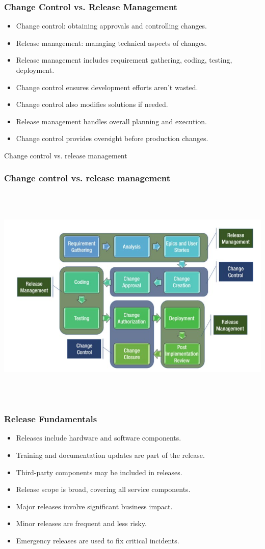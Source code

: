 \documentclass[aspectratio=169, table]{beamer}
\begin{document}
\begin{frame}
	\frametitle{Change Control vs. Release Management}
	\begin{itemize}
		\item Change control: obtaining approvals and controlling changes.
		\item Release management: managing technical aspects of changes.
		\item Release management includes requirement gathering, coding, testing, deployment.
		\item Change control ensures development efforts aren't wasted.
		\item Change control also modifies solutions if needed.
		\item Release management handles overall planning and execution.
		\item Change control provides oversight before production changes.
	\end{itemize}
\end{frame}

\begin{frame}{Change control vs. release management} 	 \frametitle{Change control vs. release management} \begin{center} 	\includegraphics[width=0.8\linewidth]{images/image-01.png} \end{center} \end{frame}

\begin{frame}
	\frametitle{Release Fundamentals}
	\begin{itemize}
		\item Releases include hardware and software components.
		\item Training and documentation updates are part of the release.
		\item Third-party components may be included in releases.
		\item Release scope is broad, covering all service components.
		\item Major releases involve significant business impact.
		\item Minor releases are frequent and less risky.
		\item Emergency releases are used to fix critical incidents.
	\end{itemize}
\end{frame}
\end{document}
